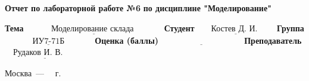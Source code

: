 \documentclass[16pt]{report}
\begin{document}
\begin{titlepage}
	
	\begin{center}
		\noindent\begin{minipage}{1.3\textwidth}\centering
			\Large\textbf{  Отчет по лабораторной работе №6}\newline
			\textbf{по дисциплине "Моделирование"}\newline
			\newline\newline\newline
		\end{minipage}
	\end{center}
	
	\noindent\textbf{Тема} $\underline{\text{~~~~~~~~~Моделирование склада~~~~~~~~~~}}$\newline\newline
	\noindent\textbf{Студент} $\underline{\text{~~~~~Костев Д. И.~~~~~~}}$\newline\newline
	\noindent\textbf{Группа} $\underline{\text{~~~~~~~~~~ИУ7-71Б~~~~~~~~~~}}$\newline\newline
	\noindent\textbf{Оценка (баллы)} $\underline{\text{~~~~~~~~~~~~~~~~~~~~~~~~~~~~~}}$\newline\newline
	\noindent\textbf{Преподаватель} $\underline{\text{~~~Рудаков И. В.~~~~~~~~}}$\newline\newline\newline
	
	\begin{center}
		\vfill
		Москва~---~\the\year
		~г.
	\end{center}
\end{titlepage}

\newpage
\end{document}
